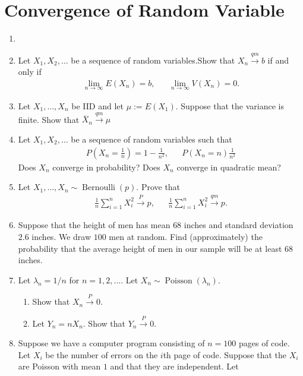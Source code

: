 \documentclass{article}
\begin{document}
\section{Convergence of Random Variable}
\begin{enumerate}
	\item
	\item Let $X_1, X_2, \dots$ be a sequence of random variables.Show that $X_n \overset{qm}{\longrightarrow} b$ if and only if
	$$
	\begin{aligned}
	\lim_{n \rightarrow \infty} E(X_n) = b,&&\lim_{n \rightarrow \infty}V(X_n) = 0.
	\end{aligned}
	$$
	\item Let $X_1, \dots, X_n$ be IID and let $\mu := E(X_1)$. Suppose that the variance is finite. Show that $\overline{X}_n \overset{qm}{\longrightarrow} \mu$
	\item Let $X_1, X_2, \dots$ be a sequence of random variables such that
	$$
	\begin{aligned}
	P\left(X_n = \frac{1}{n}\right) = 1 - \frac{1}{n^2},&& P(X_n = n) \frac{1}{n^2}
	\end{aligned}
	$$
	Does $X_n$ converge in probability? Does $X_n$ converge in quadratic mean?
	\item Let $X_1, \dots, X_n \sim \operatorname{Bernoulli}(p)$. Prove that
	$$
	\begin{aligned}
	\frac{1}{n} \sum_{i = 1}^n X_i^2 \overset{P}{\longrightarrow} p,&& \frac{1}{n}\sum_{i = 1}^n X_i^2 \overset{qm}{\longrightarrow} p.
	\end{aligned}
	$$
	\item Suppose that the height of men has mean $68$ inches and standard deviation $2.6$ inches. We draw $100$ men at random. Find (approximately) the probability that the average height of men in our sample will be at least $68$ inches.
	\item Let $\lambda_n = 1 / n$ for $n = 1, 2, \dots$. Let $X_n \sim \operatorname{Poisson}(\lambda_n)$.
		\begin{enumerate}
			\item Show that $X_n \overset{P}{\longrightarrow} 0$.
			\item Let $Y_n = nX_n$. Show that $Y_n \overset{P}{\longrightarrow} 0$.
		\end{enumerate}
	\item Suppose we have a computer program consisting of $n = 100$ pages of code. Let $X_i$ be the number of errors on the $i$th page of code. Suppose that the $X_i$ are Poisson with mean $1$ and that they are independent. Let

\end{enumerate}
\end{document}
